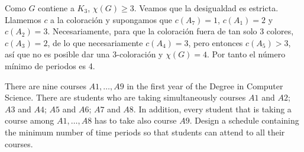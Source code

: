 \documentclass[twoside]{article}
\begin{document}
\begin{solucion}
Como $G$ contiene a $K_3$, $\chi(G)\geq 3$. Veamos que la desigualdad es estricta. Llamemos $c$ a la coloración y supongamos que $c(A_7)=1$, $c(A_1)=2$ y $c(A_2)=3$. Necesariamente, para que la coloración fuera de tan solo 3 colores, $c(A_3)=2$, de lo que necesariamente $c(A_4)=3$, pero entonces $c(A_5)>3$, así que no es posible dar una 3-coloración y $\chi(G)=4$. Por tanto el número mínimo de periodos es 4. 

\end{solucion}

\newpage

\begin{ejercicio}{3.5}

There are nine courses $A1,\dots, A9$ in the first year of the Degree in Computer Science.
There are students who are taking simultaneously courses $A1$ and $A2$; $A3$ and $A4$; $A5$
and $A6$; $A7$ and $A8$. In addition, every student that is taking a course among $A1,\dots, A8$
has to take also course $A9$. Design a schedule containing the minimum number of time
periods so that students can attend to all their courses.

\end{ejercicio}
\end{document}
